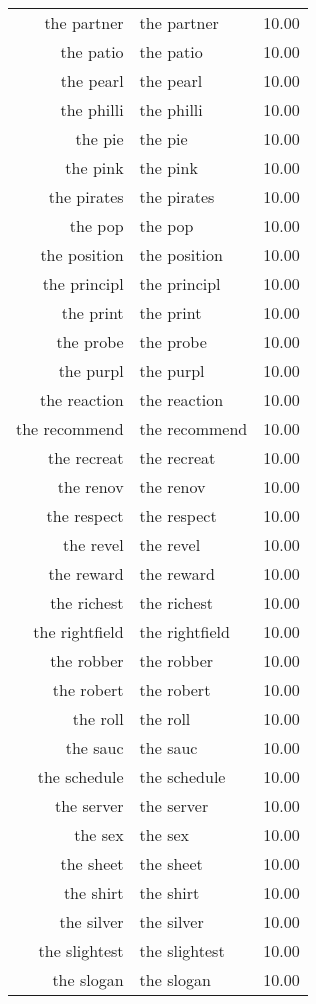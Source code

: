 \begin{table}[ht]
\begin{tabular}{rlr}
  the partner & the partner & 10.00 \\ 
  the patio & the patio & 10.00 \\ 
  the pearl & the pearl & 10.00 \\ 
  the philli & the philli & 10.00 \\ 
  the pie & the pie & 10.00 \\ 
  the pink & the pink & 10.00 \\ 
  the pirates & the pirates & 10.00 \\ 
  the pop & the pop & 10.00 \\ 
  the position & the position & 10.00 \\ 
  the principl & the principl & 10.00 \\ 
  the print & the print & 10.00 \\ 
  the probe & the probe & 10.00 \\ 
  the purpl & the purpl & 10.00 \\ 
  the reaction & the reaction & 10.00 \\ 
  the recommend & the recommend & 10.00 \\ 
  the recreat & the recreat & 10.00 \\ 
  the renov & the renov & 10.00 \\ 
  the respect & the respect & 10.00 \\ 
  the revel & the revel & 10.00 \\ 
  the reward & the reward & 10.00 \\ 
  the richest & the richest & 10.00 \\ 
  the rightfield & the rightfield & 10.00 \\ 
  the robber & the robber & 10.00 \\ 
  the robert & the robert & 10.00 \\ 
  the roll & the roll & 10.00 \\ 
  the sauc & the sauc & 10.00 \\ 
  the schedule & the schedule & 10.00 \\ 
  the server & the server & 10.00 \\ 
  the sex & the sex & 10.00 \\ 
  the sheet & the sheet & 10.00 \\ 
  the shirt & the shirt & 10.00 \\ 
  the silver & the silver & 10.00 \\ 
  the slightest & the slightest & 10.00 \\ 
  the slogan & the slogan & 10.00 \\ 

\end{tabular}
\end{table}

